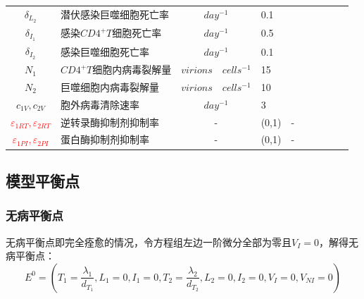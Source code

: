 \documentclass{ctexart}
\begin{document}
\begin{table}[H]
\begin{tabular}{clclclclcl}
        $\delta_{L_{2}}$                                         & 潜伏感染巨噬细胞死亡率               & $day^{-1}$                & 0.1                 & \cite{10} \\
        $\delta_{I_{1}}$                                         & 感染$CD4^{+}T$细胞死亡率         & $day^{-1}$                & 0.5                 & \cite{11} \\
        $\delta_{I_{2}}$                                         & 感染巨噬细胞死亡率                 & $day^{-1}$                & 0.1                 & \cite{11} \\
        $N_{1}$                                                  & $CD4^{+}T$细胞内病毒裂解量        & $virions\quad cells^{-1}$ & 15                  & \cite{10} \\
        $N_{2}$                                                  & 巨噬细胞内病毒裂解量                & $virions\quad cells^{-1}$ & 10                  & \cite{11} \\
        $c_{1V},c_{2V}$                                          & 胞外病毒清除速率                  & $day^{-1}$                & 3                   & \cite{4}  \\
        \textcolor{red}{$\varepsilon _{1RT},\varepsilon _{2RT}$} & 逆转录酶抑制剂抑制率                & -                         & (0,1)               & -         \\
        \textcolor{red}{$\varepsilon _{1PI},\varepsilon _{2PI}$} & 蛋白酶抑制剂抑制率                 & -                         & (0,1)               & -         \\
        \bottomrule
    \end{tabular}
\end{table}

\subsection{模型平衡点}
\subsubsection{无病平衡点}
无病平衡点即完全痊愈的情况，令方程组左边一阶微分全部为零且$V_{I}=0$，解得无病平衡点：
$$E^{0}=\left(T_{1}=\frac{\lambda_{1}}{d_{T_{1}}},L_{1}=0,I_{1}=0,T_{2}=\frac{\lambda_{2}}{d_{T_{2}}},L_{2}=0,I_{2}=0,V_{I}=0,V_{NI}=0\right) $$
\end{document}
